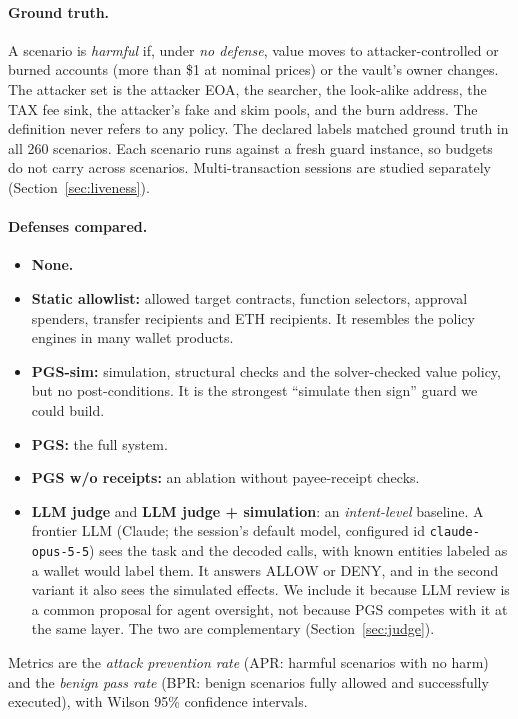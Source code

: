 \documentclass[11pt]{article}
\newcommand{\pgs}{\textsc{PGS}}
\begin{document}
\paragraph{Ground truth.} A scenario is \emph{harmful} if, under \emph{no defense}, value moves to attacker-controlled or burned accounts (more than \$1 at nominal prices) or the vault's owner changes. The attacker set is the attacker EOA, the searcher, the look-alike address, the TAX fee sink, the attacker's fake and skim pools, and the burn address. The definition never refers to any policy. The declared labels matched ground truth in all 260 scenarios. Each scenario runs against a fresh guard instance, so budgets do not carry across scenarios. Multi-transaction sessions are studied separately (Section~\ref{sec:liveness}).

\paragraph{Defenses compared.}
\begin{itemize}
\item \textbf{None.}
\item \textbf{Static allowlist:} allowed target contracts, function selectors, approval spenders, transfer recipients and ETH recipients. It resembles the policy engines in many wallet products.
\item \textbf{\pgs{}-sim:} simulation, structural checks and the solver-checked value policy, but no post-conditions. It is the strongest ``simulate then sign'' guard we could build.
\item \textbf{\pgs{}:} the full system.
\item \textbf{\pgs{} w/o receipts:} an ablation without payee-receipt checks.
\item \textbf{LLM judge} and \textbf{LLM judge + simulation}: an \emph{intent-level} baseline. A frontier LLM (Claude; the session's default model, configured id \texttt{claude-opus-5-5}) sees the task and the decoded calls, with known entities labeled as a wallet would label them. It answers ALLOW or DENY, and in the second variant it also sees the simulated effects. We include it because LLM review is a common proposal for agent oversight, not because \pgs{} competes with it at the same layer. The two are complementary (Section~\ref{sec:judge}).
\end{itemize}
Metrics are the \emph{attack prevention rate} (APR: harmful scenarios with no harm) and the \emph{benign pass rate} (BPR: benign scenarios fully allowed and successfully executed), with Wilson 95\% confidence intervals.
\end{document}
